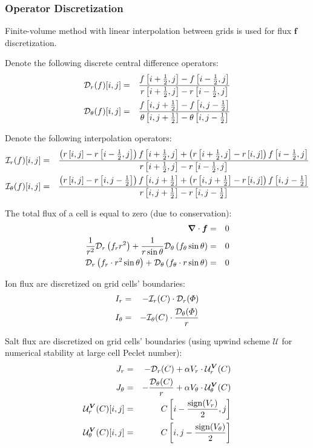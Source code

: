 \subsubsection{Operator Discretization}
Finite-volume method with linear interpolation between grids is used for flux 
$\boldsymbol{f}$ discretization. 

Denote the following discrete central difference operators:
\begin{eqnarray}
\mathcal{D}_r(f)[i,j] &=& \frac{f\left[i+\frac{1}{2},j\right] - f\left[i-\frac{1}{2},j\right]}
                       {r\left[i+\frac{1}{2},j\right] - r\left[i-\frac{1}{2},j\right]} \\
\mathcal{D}_\theta(f)[i,j] &=& \frac{f\left[i,j+\frac{1}{2}\right] - f\left[i,j-\frac{1}{2}\right]}
					   {\theta\left[i,j+\frac{1}{2}\right] - \theta\left[i,j-\frac{1}{2}\right]}
\end{eqnarray}

Denote the following interpolation operators:
\begin{eqnarray}
\mathcal{I}_r(f)[i,j] &=& \frac{
\left(r\left[i,j\right] - r\left[i-\frac{1}{2},j\right]\right) 
  f\left[i+\frac{1}{2},j\right] + 
\left(r\left[i+\frac{1}{2},j\right] - r\left[i,j\right]\right) 
  f\left[i-\frac{1}{2},j\right] 
}{r\left[i+\frac{1}{2},j\right] - r\left[i-\frac{1}{2},j\right]}
\\
\mathcal{I}_\theta(f)[i,j] &=& 
\frac{
\left(r\left[i,j\right] - r\left[i,j-\frac{1}{2}\right]\right) 
  f\left[i,j+\frac{1}{2}\right] + 
\left(r\left[i,j+\frac{1}{2}\right] - r\left[i,j\right]\right) 
  f\left[i,j-\frac{1}{2}\right] 
}{r\left[i,j+\frac{1}{2}\right] - r\left[i,j-\frac{1}{2}\right]}
\end{eqnarray}

The total flux of a cell is equal to zero (due to conservation):
\begin{eqnarray}
\boldsymbol{\nabla} \cdot \boldsymbol{f} &=& 0 
\\
\frac{1}{r^2} \mathcal{D}_r\left(f_r r^2\right) + 
\frac{1}{r \sin\theta} \mathcal{D}_\theta\left(f_\theta \sin\theta\right) &=& 0 
\\
\mathcal{D}_r\left(f_r \cdot r^2 \sin\theta\right) + \mathcal{D}_\theta\left(f_\theta \cdot r \sin\theta\right) &=& 0 
\end{eqnarray}

Ion flux are discretized on grid cells' boundaries:
\begin{eqnarray}
I_r &=& -\mathcal{I}_r(C) \cdot \mathcal{D}_r(\varPhi) \\
I_\theta &=& -\mathcal{I}_\theta(C) \cdot \frac{\mathcal{D}_\theta(\varPhi)}{r} 
\end{eqnarray}

Salt flux are discretized on grid cells' boundaries 
(using upwind scheme $\mathcal{U}$ for numerical stability at large cell Peclet number):
\begin{eqnarray}
J_r &=& -\mathcal{D}_r(C) + \alpha V_r \cdot \mathcal{U}^{\boldsymbol{V}}_r (C) \\
J_\theta &=& -\frac{\mathcal{D}_\theta(C)}{r} + \alpha V_\theta \cdot \mathcal{U}^{\boldsymbol{V}}_\theta (C) \\
\nonumber \mathcal{U}^{\boldsymbol{V}}_r(C)[i,j] &=& C\left[i-\frac{\mathrm{sign}(V_r)}{2}, j\right] \\
\nonumber \mathcal{U}^{\boldsymbol{V}}_\theta(C)[i,j] &=& C\left[i, j-\frac{\mathrm{sign}(V_\theta)}{2}\right] 
\end{eqnarray}

